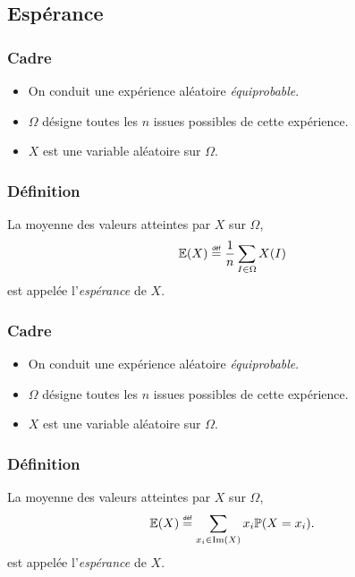 \documentclass[main.tex]{subfiles}
\begin{document}
\subsection{Espérance}

\begin{definition}

    \subsubsection{Cadre}
    \begin{itemize}
        \item On conduit une expérience aléatoire \emph{équiprobable}.
        \item $\Omega$ désigne toutes les $n$ issues possibles de cette expérience.
        \item $X$ est une variable aléatoire sur $\Omega$.
    \end{itemize}

    \subsubsection{Définition}
    La moyenne des valeurs atteintes par $X$ sur $\Omega$,
    \begin{align}
        \E(X) \defeq \frac 1 n \sum_{I \in \Omega} X(I)
    \end{align}
    est appelée l'\emph{espérance} de $X$.
\end{definition}

\begin{definition}
    [Espérance]

    \subsubsection{Cadre}
    \begin{itemize}
        \item On conduit une expérience aléatoire \emph{équiprobable}.
        \item $\Omega$ désigne toutes les $n$ issues possibles de cette expérience.
        \item $X$ est une variable aléatoire sur $\Omega$.
    \end{itemize}

    \subsubsection{Définition}
    La moyenne des valeurs atteintes par $X$ sur $\Omega$,
    \begin{align}
        \E(X) \defeq \sum_{x_i \in \im(X)} x_i \Pr(X = x_i).
    \end{align}
    est appelée l'\emph{espérance} de $X$.
\end{definition}
\end{document}
